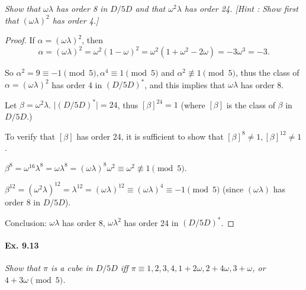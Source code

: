 \documentclass[11pt,a4paper]{article}
\begin{document}
{\it Show that $\omega \lambda$ has order 8 in $D/5D$ and that $\omega^2 \lambda$ has order 24. [Hint : Show first that $(\omega \lambda)^2$ has order 4.]
}

\begin{proof} If $\alpha = (\omega \lambda)^2$, then
$$\alpha = (\omega \lambda)^2 = \omega^2 (1-\omega)^2 = \omega^2(1 + \omega^2-2 \omega) = -3\omega^3= -3.$$

So $\alpha^2 =9 \equiv -1\pmod 5, \alpha^4 \equiv 1 \pmod 5$ and $\alpha^2 \not \equiv 1 \pmod 5$, thus the class of $\alpha= (\omega \lambda)^2$ has order 4 in $(D/5D)^*$, and this implies that $\omega \lambda$ has order 8.

Let $\beta = \omega^2 \lambda$. $\vert (D/5 D)^* \vert = 24$, thus  $[\beta]^{24} = 1$ (where $[\beta]$ is the class of $\beta$ in $D/5D$.)

To verify that $[\beta]$ has order 24, it is sufficient to show that $[\beta]^{8}\neq 1,[\beta]^{12}\neq 1$.

$\beta^8 = \omega ^{16} \lambda^8 = \omega \lambda^8 = (\omega \lambda)^8 \omega^2 \equiv  \omega^2 \not \equiv 1 \pmod 5$.

$\beta^{12} = (\omega^2 \lambda)^{12} = \lambda^{12} = (\omega \lambda)^{12} \equiv  (\omega \lambda)^{4}  \equiv -1 \pmod 5$ (since $(\omega \lambda)$ has order 8 in $D/5D$).


Conclusion: $\omega \lambda$ has order 8, $\omega \lambda^2$ has order 24 in $(D/5D)^*$.
\end{proof}

\paragraph{Ex. 9.13}

{\it Show that $\pi$ is a cube in $D/5D$ iff $\pi \equiv 1,2,3,4,1+2\omega, 2 + 4\omega, 3 + \omega$, or $4+3\omega \pmod 5$.
}
\end{document}
